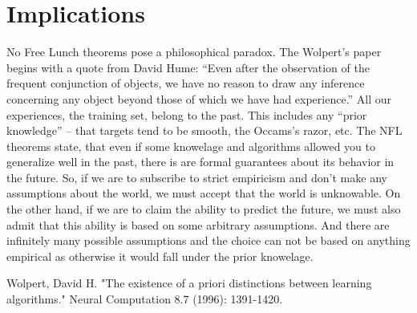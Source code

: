 \documentclass[a4paper]{article}
\begin{document}
\section{Implications}
No Free Lunch theorems pose a philosophical paradox. The Wolpert's
paper begins with a quote from David Hume: ``Even after the
observation of the frequent conjunction of objects, we have no reason
to draw any inference concerning any object beyond those of which we
have had experience.'' All our experiences, the training set, belong
to the past. This includes any ``prior knowledge'' -- that targets
tend to be smooth, the Occams's razor, etc. The NFL theorems state,
that even if some knowelage and algorithms allowed you to generalize
well in the past, there is are formal guarantees about its behavior in
the future. So, if we are to subscribe to strict empiricism and don't
make any assumptions about the world, we must accept that the world is
unknowable. On the other hand, if we are to claim the ability to
predict the future, we must also admit that this ability is based on
some arbitrary assumptions. And there are infinitely many possible
assumptions and the choice can not be based on anything empirical as
otherwise it would fall under the prior knowelage.

\glsaddall
\printglossaries

\begin{thebibliography}{99}
 Wolpert, David H. "The existence of a
  priori distinctions between learning algorithms." Neural Computation
  8.7 (1996): 1391-1420.
\end{thebibliography}
\end{document}
